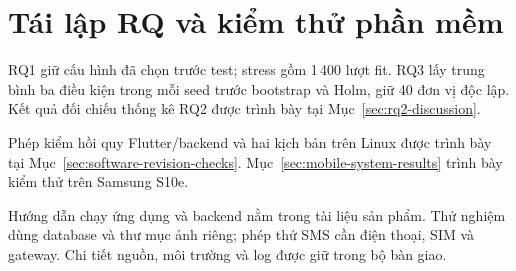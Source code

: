 \section{Tái lập RQ và kiểm thử phần mềm}
RQ1 giữ cấu hình đã chọn trước test; stress gồm 1\,400 lượt fit. RQ3 lấy trung bình ba điều kiện trong mỗi seed trước bootstrap và Holm, giữ 40 đơn vị độc lập. Kết quả đối chiếu thống kê RQ2 được trình bày tại Mục~\ref{sec:rq2-discussion}.

Phép kiểm hồi quy Flutter/backend và hai kịch bản trên Linux được trình bày tại Mục~\ref{sec:software-revision-checks}. Mục~\ref{sec:mobile-system-results} trình bày kiểm thử trên Samsung S10e.

Hướng dẫn chạy ứng dụng và backend nằm trong tài liệu sản phẩm. Thử nghiệm dùng database và thư mục ảnh riêng; phép thử SMS cần điện thoại, SIM và gateway. Chi tiết nguồn, môi trường và log được giữ trong bộ bàn giao.
